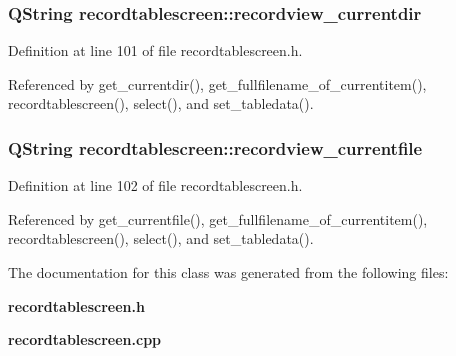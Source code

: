 \subsubsection{\setlength{\rightskip}{0pt plus 5cm}QString {\bf recordtablescreen::recordview\_\-currentdir}\hspace{0.3cm}{\tt  [private]}}\label{classrecordtablescreen_b7e9dbe44d4e786ac7aa1572990057d9}




Definition at line 101 of file recordtablescreen.h.

Referenced by get\_\-currentdir(), get\_\-fullfilename\_\-of\_\-currentitem(), recordtablescreen(), select(), and set\_\-tabledata().
\subsubsection{\setlength{\rightskip}{0pt plus 5cm}QString {\bf recordtablescreen::recordview\_\-currentfile}\hspace{0.3cm}{\tt  [private]}}\label{classrecordtablescreen_c95f81253a5ba51b15a9c2fdea58b436}




Definition at line 102 of file recordtablescreen.h.

Referenced by get\_\-currentfile(), get\_\-fullfilename\_\-of\_\-currentitem(), recordtablescreen(), select(), and set\_\-tabledata().

The documentation for this class was generated from the following files:\begin{CompactItemize}
\item 
{\bf recordtablescreen.h}\item 
{\bf recordtablescreen.cpp}\end{CompactItemize}
